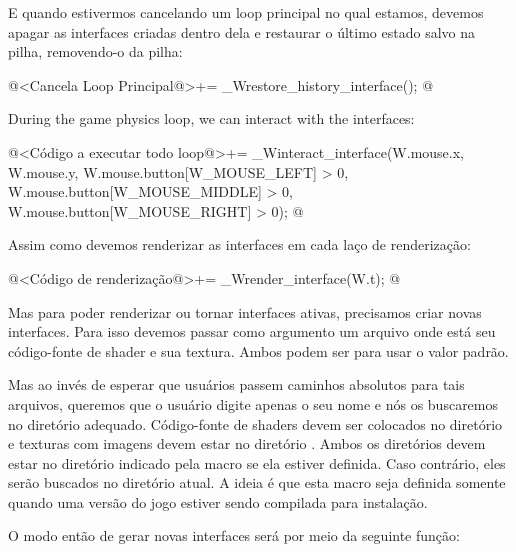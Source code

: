 E quando estivermos cancelando um loop principal no qual estamos,
devemos apagar as interfaces criadas dentro dela e restaurar o último
estado salvo na pilha, removendo-o da pilha:

\iniciocodigo
@<Cancela Loop Principal@>+=
_Wrestore_history_interface();
@
\fimcodigo

During the game physics loop, we can interact with the interfaces:

\iniciocodigo
@<Código a executar todo loop@>+=
_Winteract_interface(W.mouse.x, W.mouse.y,
                     W.mouse.button[W_MOUSE_LEFT] > 0,
                     W.mouse.button[W_MOUSE_MIDDLE] > 0,
                     W.mouse.button[W_MOUSE_RIGHT] > 0);
@
\fimcodigo

Assim como devemos renderizar as interfaces em cada laço de
renderização:

\iniciocodigo
@<Código de renderização@>+=
_Wrender_interface(W.t);
@
\fimcodigo

Mas para poder renderizar ou tornar interfaces ativas, precisamos
criar novas interfaces. Para isso devemos passar como argumento um
arquivo onde está seu código-fonte de shader e sua textura. Ambos
podem ser  para usar o valor padrão.

Mas ao invés de esperar que usuários passem caminhos absolutos para
tais arquivos, queremos que o usuário digite apenas o seu nome e nós
os buscaremos no diretório adequado. Código-fonte de shaders devem ser
colocados no diretório  e texturas com imagens
devem estar no diretório . Ambos os diretórios
devem estar no diretório indicado pela macro 
se ela estiver definida. Caso contrário, eles serão buscados no
diretório atual. A ideia é que esta macro seja definida somente quando
uma versão do jogo estiver sendo compilada para instalação.

O modo então de gerar novas interfaces será por meio da seguinte
função:


